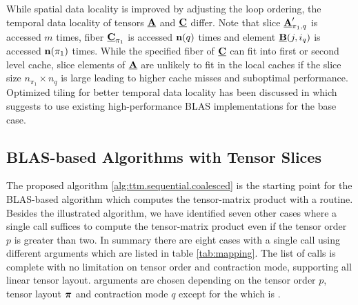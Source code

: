 While spatial data locality is improved by adjusting the loop ordering, the temporal data locality of tensors $\underline{\mathbf{A}}$ and $\underline{\mathbf{C}}$ differ.
Note that slice $\underline{\mathbf{A}}_{\pi_1,q}'$ is accessed $m$ times, fiber $\underline{\mathbf{C}}_{\pi_1}$ is accessed $\mathbf{n}(q)$ times and element $\underline{\mathbf{B}}(j,i_q)$ is accessed $\mathbf{n}(\pi_1)$ times.
While the specified fiber of $\underline{\mathbf{C}}$ can fit into first or second level cache, slice elements of $\underline{\mathbf{A}}$ are unlikely to fit in the local caches if the slice size $n_{\pi_1} \times n_q$ is large leading to higher cache misses and suboptimal performance.
Optimized tiling for better temporal data locality has been discussed in \cite{goto:2008:gemm} which suggests to use existing high-performance BLAS implementations for the base case.

\subsection{BLAS-based Algorithms with Tensor Slices}
\label{sec:design:blas.based.algorithm}
The proposed algorithm \ref{alg:ttm.sequential.coalesced} is the starting point for the BLAS-based algorithm which computes the tensor-matrix product with a  routine.
Besides the illustrated algorithm, we have identified seven other cases where a single  call suffices to compute the tensor-matrix product even if the tensor order $p$ is greater than two.
In summary there are eight cases with a single  call using different arguments which are listed in table \ref{tab:mapping}.
The list of  calls is complete with no limitation on tensor order and contraction mode, supporting all linear tensor layout.
 arguments are chosen depending on the tensor order $p$, tensor layout $\boldsymbol{\pi}$ and contraction mode $q$ except for the  which is .


